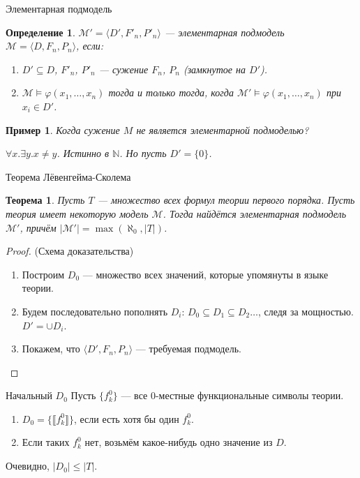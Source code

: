 \documentclass[aspectratio=169]{beamer}
\newtheorem{thm}{Теорема}[section]
\newtheorem{dfn}{Определение}[section]
\newtheorem{exm}{Пример}[section]
\begin{document}
\begin{frame}{Элементарная подмодель}
\begin{dfn}$\mathcal{M}' = \langle D', F'_n, P'_n \rangle$ --- элементарная подмодель $\mathcal{M} = \langle D, F_n, P_n \rangle$, 
если: \pause
\begin{enumerate}
\item $D' \subseteq D$, \pause $F'_n$, $P'_n$ --- сужение $F_n$, $P_n$ (замкнутое на $D'$). \pause
\item $\mathcal{M}\models \varphi(x_1,\dots,x_n)$ тогда и только тогда, когда $\mathcal{M}'\models \varphi(x_1,\dots,x_n)$
при $x_i \in D'$. \pause
\end{enumerate}
\end{dfn}

\begin{exm}Когда сужение $M$ не является элементарной подмоделью? \pause

$\forall x.\exists y.x \ne y$. Истинно в $\mathbb{N}$. \pause Но пусть $D' = \{ 0 \}$.
\end{exm}
\end{frame}

\begin{frame}{Теорема Лёвенгейма-Сколема}
\begin{thm}Пусть $T$ --- множество всех формул теории первого порядка. 
Пусть теория имеет некоторую модель $\mathcal{M}$.
Тогда найдётся элементарная подмодель $\mathcal{M'}$, причём $|\mathcal{M'}| = \max(\aleph_0, |T|)$.
\end{thm}\pause

\begin{proof} (Схема доказательства)
\begin{enumerate} 
\item Построим $D_0$ --- множество всех значений, которые упомянуты в языке теории. \pause
\item Будем последовательно пополнять $D_i$: $D_0 \subseteq D_1 \subseteq D_2 \dots$, следя за мощностью.
$D' = \cup D_i$.
\item Покажем, что $\langle D', F_n, P_n\rangle$ --- требуемая подмодель.
\end{enumerate}
\end{proof}
\end{frame}

\begin{frame}{Начальный $D_0$}
Пусть $\{f^0_k\}$ --- все 0-местные функциональные символы теории. \pause
\begin{enumerate}
\item $D_0 = \{ \llbracket f^0_k \rrbracket \}$, если есть хотя бы один $f^0_k$. \pause
\item Если таких $f^0_k$ нет, возьмём какое-нибудь одно значение из $D$. \pause
\end{enumerate}\pause

Очевидно, $|D_0| \le |T|$.
\end{frame}
\end{document}
